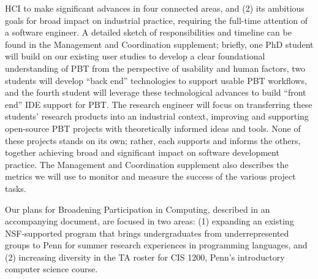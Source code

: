 HCI to make significant advances in four connected areas, and (2) its
ambitious goals for broad impact on industrial
practice, requiring the full-time attention of a software engineer.
%
A detailed sketch of responsibilities and timeline can be found in the
Management and Coordination supplement; briefly,
one PhD student will build on our existing user studies to
develop a clear foundational understanding of
PBT from the perspective of usability and human factors, two students
will develop ``back end'' technologies to support usable
PBT workflows, and the fourth student will leverage these technological
advances to build ``front end'' IDE support for PBT. The
research engineer will focus on transferring these
students' research products into an industrial context, improving and supporting
open-source PBT projects with theoretically informed ideas and tools. None of these
projects stands on its own; rather, each supports and informs the
others, together achieving broad and significant impact on software
development practice.
%
The Management and Coordination supplement also describes the metrics
we will use to monitor and measure the success of the various project
tasks.



Our plans for Broadening Participation in Computing, described in an
accompanying document, are focused in two areas: (1) expanding an
existing NSF-supported program that brings undergraduates from
underrepresented groups to Penn for summer research experiences in
programming languages, and (2) increasing diversity in the TA roster
for CIS 1200, Penn's introductory computer science course.

\iflater
{}
\fi

